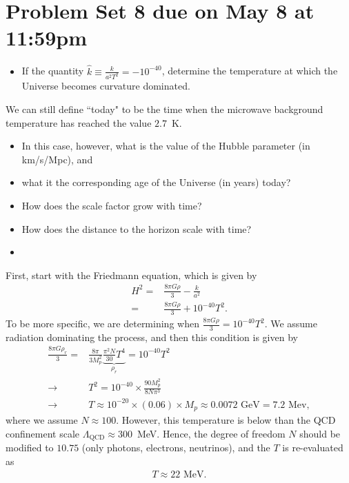 \section*{Problem Set 8 due on May 8 at 11:59pm}

\begin{itemize}
    \item [(a)] If the quantity $\hat{k}\equiv\frac{k}{a^2 T^2}=-10^{-40}$, determine the temperature at which the Universe becomes curvature dominated. 
\end{itemize}

We can still define ``today" to be the time when the microwave background temperature has reached the value $2.7$~K. 

\begin{itemize}
    \item [(b)] In this case, however, what is the value of the Hubble parameter (in km/s/Mpc), and
    \item [(c)] what it the corresponding age of the Universe (in years) today?
    \item [(d)] How does the scale factor grow with time?
    \item [(e)] How does the distance to the horizon scale with time?
\end{itemize}
\answer{}
\begin{itemize}
    \item [(a)]
\end{itemize}
First, start with the Friedmann equation, which is given by 
\begin{align}
    H^2 =& \frac{8\pi G \rho}{3}- \frac{k}{a^2}\\
    =&\frac{8\pi G \rho}{3} + 10^{-40} T^2.
\end{align}
To be more specific, we are determining when $\frac{8\pi G \rho}{3}=10^{-40} T^2$. We assume radiation dominating the process, and then this condition is given by
\begin{align}
    \frac{8\pi G \rho_r}{3}=& \frac{8\pi}{3 M_p^2} \underbrace{\frac{\pi^2N}{30} T^4}_{\rho_r} = 10^{-40} T^2\\
    \rightarrow& T^2 =10^{-40}\times\frac{90M_p^2}{8N\pi^3}\\
    \rightarrow& T \approx 10^{-20}\times(0.06)\times M_p\approx0.0072\text{ GeV} = 7.2 \text{ Mev},
\end{align}
where we assume $N\approx100$. However, this temperature is below than the QCD confinement scale $\Lambda_\text{QCD}\approx300$~MeV. Hence, the degree of freedom $N$ should be modified to $10.75$ (only photons, electrons, neutrinos), and the $T$ is re-evaluated as 
\begin{align}
    T\approx 22\text{ MeV}.
\end{align}

